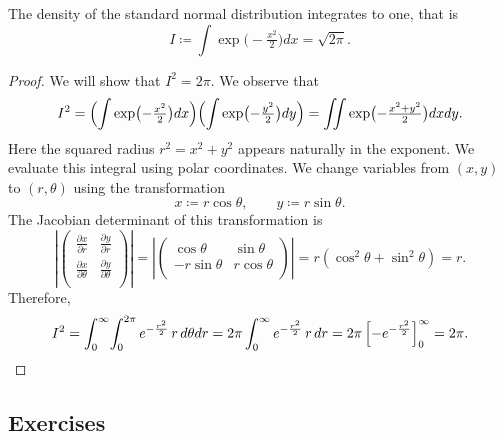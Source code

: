 \begin{lemma}
    \label{lem: standard normal density integrates to one}
    The density of the standard normal distribution integrates to one, that is
    \[
        I \coloneq \int \exp\bigl(-\tfrac{x^2}{2}\bigr) dx = \sqrt{2\pi}.
    \]
\end{lemma}
\begin{proof}
We will show that $I^2=2\pi$. We observe that
\[
I^2 =
    \Bigl(\int \exp\bigl(-\tfrac{x^2}{2}\bigr) dx \Bigr)
    \Bigl(\int \exp\bigl(-\tfrac{y^2}{2}\bigr) dy \Bigr)
    =\iint \exp\bigl(-\tfrac{x^2+y^2}{2}\bigr) dx dy.
\]
Here the squared radius \(r^2 = x^2 + y^2\) appears naturally in the exponent.
We evaluate this integral using polar coordinates. We change variables from $(x,y)$ to $(r,\theta)$ using the transformation
\[
    x \coloneqq r \cos\theta, \qquad y \coloneqq r \sin\theta.
\]
The Jacobian determinant of this transformation is
\[
\left|\begin{pmatrix}
\frac{\partial x}{\partial r} & \frac{\partial y}{\partial r} \\
\frac{\partial x}{\partial \theta} & \frac{\partial y}{\partial \theta} \\
\end{pmatrix}\right| 
= \left|\begin{pmatrix}
\cos\theta & \sin\theta \\
-r\sin\theta & r\cos\theta \\
\end{pmatrix}\right| = r(\cos^2\theta + \sin^2\theta) = r.
\]
Therefore,
\[
I^2 = 
\int_{0}^\infty\! \int_{0}^{2\pi} e^{-\frac{r^2}{2}} \, r \, d\theta dr
=  2\pi \int_0^\infty e^{-\frac{r^2}{2}} \, r \, dr 
= 2\pi \left[-e^{-\frac{r^2}{2}}\right]_{0}^{\infty}
= 2\pi.
\qedhere
\]
\end{proof}

\subsection*{Exercises \thesection}










